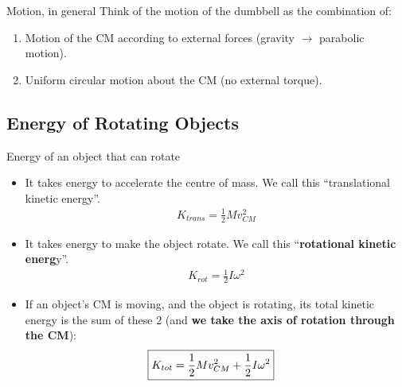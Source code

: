 \documentclass[aspectratio=169,
hyperref={colorlinks,urlcolor=blue}
]{beamer}
\begin{document}
\begin{frame}{Motion, in general}
Think of the motion of the dumbbell as the combination of:
\begin{enumerate}
\item Motion of the CM according to external forces (gravity $\rightarrow$ parabolic motion).
\item Uniform circular motion about the CM (no external torque).
\end{enumerate}
\end{frame}



\subsection{Energy of Rotating Objects}
\label{subsec:energyofarotatingobject}
\begin{frame}{Energy of an object that can rotate}
\begin{itemize}
\item It takes energy to accelerate the centre of mass. We call this ``translational kinetic energy''.
\begin{align*}
K_{trans}=\frac{1}{2}Mv_{CM}^2
\end{align*}
\item It takes energy to make the object rotate. We call this ``\textbf{rotational kinetic energ}y''. 
\begin{align*}
K_{rot}=\frac{1}{2}I\omega^2
\end{align*}
\item If an object's CM is moving, and the object is rotating, its total kinetic energy is the sum of these 2 (and \textbf{we take the axis of rotation through the CM}):
\begin{align*}
\Aboxed{K_{tot}=\frac{1}{2}Mv_{CM}^2+\frac{1}{2}I\omega^2}
\end{align*}
\end{itemize}
\end{frame}
\end{document}
